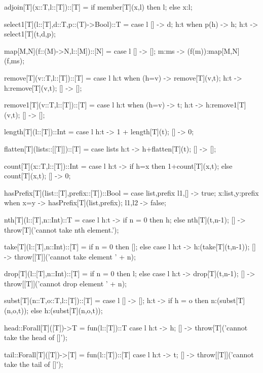 \documentclass[5p,times]{elsarticle}
\begin{document}
\label{sec:list_operations}


\begin{FigESL}
adjoin[T](x::T,l::[T])::[T] =
  if member[T](x,l)
  then l;
  else x:l;
  
select1[T](l::[T],d::T,p::(T)->Bool)::T =
  case l {
    [] -> d;
    h:t when p(h) -> h;
    h:t -> select1[T](t,d,p);
  }

map[M,N](f::(M)->N,l::[M])::[N] =
  case l {
    [] -> [];
    m:ms -> (f(m)):map[M,N](f,ms); 
  }
  
remove[T](v::T,l::[T])::[T] =
  case l {
    h:t when (h=v) -> remove[T](v,t);
    h:t        -> h:remove[T](v,t);
    []         -> [];
  }

remove1[T](v::T,l::[T])::[T] =
  case l {
    h:t when (h=v) -> t;
    h:t        -> h:remove1[T](v,t);
    []         -> [];
  }

length[T](l::[T])::Int = 
  case l {
    h:t -> 1 + length[T](t);
    [] -> 0;
  }

flatten[T](lists::[[T]])::[T] =
  case lists {
    h:t -> h+flatten[T](t);
    [] -> [];
  }
        
count[T](x::T,l::[T])::Int =
  case l {
    h:t -> if h=x then 1+count[T](x,t); else count[T](x,t);
    []  -> 0;
  }
  
hasPrefix[T](list::[T],prefix::[T])::Bool =
  case list,prefix {
    l1,[] -> true;
    x:list,y:prefix when x=y -> hasPrefix[T](list,prefix);
    l1,l2 -> false;
  }
  
nth[T](l::[T],n::Int)::T =
  case l {
    h:t    -> if n = 0 then h; else nth[T](t,n-1);
    []  -> throw[T]('cannot take nth element.');
  }
  
take[T](l::[T],n::Int)::[T] = 
  if n = 0
  then [];
  else 
    case l {
      h:t -> h:(take[T](t,n-1));
      [] -> throw[[T]]('cannot take element ' + n);
    }
  
drop[T](l::[T],n::Int)::[T] = 
  if n = 0
  then l;
  else 
    case l {
      h:t -> drop[T](t,n-1);
      [] -> throw[[T]]('cannot drop element ' + n);
    }
    
subst[T](n::T,o::T,l::[T])::[T] =
  case l {
    [] -> [];
    h:t -> 
      if h = o 
      then n:(subst[T](n,o,t)); 
      else h:(subst[T](n,o,t));
  }
  
head::Forall[T]([T])->T = fun(l::[T])::T
  case l {
    h:t -> h;
    [] -> throw[T]('cannot take the head of []');
  }
  
tail::Forall[T]([T])->[T] = fun(l::[T])::[T]
  case l {
    h:t -> t;
    [] -> throw[[T]]('cannot take the tail of []');
  }
  

\end{FigESL}
\end{document}
